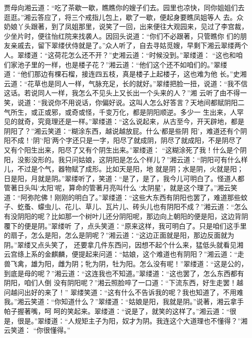 \begin{parag}


    贾母向湘云道：“吃了茶歇一歇，瞧瞧你的嫂子们去。园里也凉快，同你姐姐们去逛逛。”湘云答应了，将三个戒指儿包上，歇了一歇，便起身要瞧凤姐等人 去。众奶娘丫头跟著，到了凤姐那里，说笑了一回，出来便往大观园来，见过了李宫裁，少坐片时，便往怡红院来找袭人。因回头说道：“你们不必跟著，只管瞧你 们的朋友亲戚去，留下翠缕伏侍就是了。”众人听了，自去寻姑觅嫂，早剩下湘云翠缕两个人。翠缕道：“这荷花怎么还不开？”史湘云道：“时候没到。”翠缕道： “这也和咱们家池子里的一样，也是楼子花？”湘云道：“他们这个还不如咱们的。”翠缕道：“他们那边有棵石榴，接连四五枝，真是楼子上起楼子，这也难为他 长。”史湘云道：“花草也是同人一样，气脉充足，长的就好。”翠缕把脸一扭，说道：“我不信这话。若说同人一样，我怎么不见头上又长出一个头来的人？”湘 云听了由不得一笑，说道：“我说你不用说话，你偏好说。这叫人怎么好答言？天地间都赋阴阳二气所生，或正或邪，或奇或怪，千变万化，都是阴阳顺逆。多少一 生出来，人罕见的就奇，究竟理还是一样。”翠缕道：“这么说起来，从古至今，开天辟地，都是阴阳了？”湘云笑道：“糊涂东西，越说越放屁。什么‘都是些阴 阳’，难道还有个阴阳不成！‘阴’‘阳’两个字还只是一字，阳尽了就成阴，阴尽了就成阳，不是阴尽了又有个阳生出来，阳尽了又有个阴生出来。”翠缕道： “这糊涂死了我！什么是个阴阳，没影没形的。我只问姑娘，这阴阳是怎么个样儿？”湘云道：“阴阳可有什么样儿，不过是个气，器物赋了成形。比如天是阳，地 就是阴；水是阴，火就是阳；日是阳，月就是阴。”翠缕听了，笑道：“是了，是了，我今儿可明白了。怪道人都管著日头叫‘太阳’呢，算命的管著月亮叫什么 ‘太阴星’，就是这个理了。”湘云笑道：“阿弥陀佛！刚刚的明白了。”翠缕道：“这些大东西有阴阳也罢了，难道那些蚊子、虼蚤、蠓虫儿、花儿、草儿、瓦片儿、砖头儿也有阴阳不成？”湘云道：“怎么有没阴阳的呢？比如那一个树叶儿还分阴阳呢，那边向上朝阳的便是阳，这边背阴覆下的便是阴。”翠缕听 了，点头笑道：“原来这样，我可明白了。只是咱们这手里的扇子，怎么是阳，怎么是阴呢？”湘云道：“这边正面就是阳，那边反面就为阴。”翠缕又点头笑了， 还要拿几件东西问，因想不起个什么来，猛低头就看见湘云宫绦上系的金麒麟，便提起来问道：“姑娘，这个难道也有阴阳？”湘云道：“走兽飞禽，雄为阳，雌为阴；牝为阴，牡为阳。怎么没有呢！”翠缕道：“这是公的，到底是母的呢？”湘云道：“这连我也不知道。”翠缕道：“这也罢了，怎么东西都有阴阳，咱们人倒 没有阴阳呢？”湘云照脸啐了一口道：“下流东西，好生走罢！越问越问出好的来了！” 翠缕笑道：“这有什么不告诉我的呢？我也知道了，不用难我。”湘云笑道：“你知道什么？”翠缕道：“姑娘是阳，我就是阴。”说著，湘云拿手帕子握著嘴，呵 呵的笑起来。翠缕道：“说是了，就笑的这样了。”湘云道：“很是，很是。”翠缕道：“人规矩主子为阳，奴才为阴。我连这个大道理也不懂得？”湘云笑道： “你很懂得。”
\end{parag}


